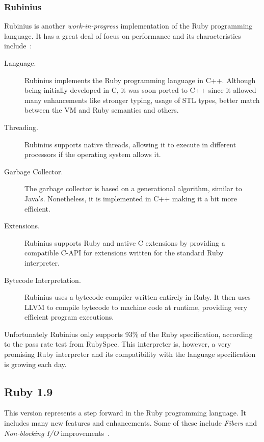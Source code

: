 \subsubsection{Rubinius}
Rubinius is another \textit{work-in-progress} implementation of the Ruby programming language. It has a great deal of focus on performance and its characteristics include~\cite{rubinius, rubinius_virtual_machine, rubinius_virtual_machine_rewrite}:
\begin{description}
\item[Language.] Rubinius implements the Ruby programming language in C++. Although being initially developed in C, it was soon ported to C++ since it allowed many enhancements like stronger typing, usage of STL types, better match between the VM and Ruby semantics and others.
\item[Threading.] Rubinius supports native threads, allowing it to execute in different processors if the operating system allows it.
\item[Garbage Collector.]  The garbage collector is based on a generational algorithm, similar to Java's. Nonetheless, it is implemented in C++ making it a bit more efficient.
\item[Extensions.]  Rubinius supports Ruby and native C extensions by providing a compatible C-API for extensions written for the standard Ruby interpreter.
\item[Bytecode Interpretation.] Rubinius uses a bytecode compiler written entirely in Ruby. It then uses LLVM to compile bytecode to machine code at runtime, providing very efficient program executions.
\end{description}
Unfortunately Rubinius only supports 93\% of the Ruby specification, according to the pass rate test from RubySpec. This interpreter is, however, a very promising Ruby interpreter and its compatibility with the language specification is growing each day.


\subsection{Ruby 1.9}
This version represents a step forward in the Ruby programming language. It includes many new features and enhancements. Some of these include \textit{Fibers} and \textit{Non-blocking I/O} improvements~\cite{changes_ruby19}.


